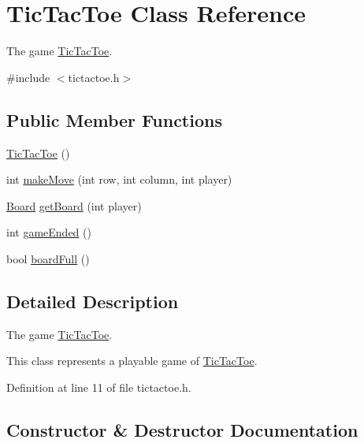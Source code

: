 \hypertarget{class_tic_tac_toe}{}\section{Tic\+Tac\+Toe Class Reference}
\label{class_tic_tac_toe}


The game \hyperlink{class_tic_tac_toe}{Tic\+Tac\+Toe}.  




{\ttfamily \#include $<$tictactoe.\+h$>$}

\subsection*{Public Member Functions}
\begin{DoxyCompactItemize}
\item 
\hyperlink{class_tic_tac_toe_a103fe9a5ae41b5ef756e20594a70cb7a}{Tic\+Tac\+Toe} ()
\item 
int \hyperlink{class_tic_tac_toe_a597a1911309c9350aa6ce48b817a0e9e}{make\+Move} (int row, int column, int player)
\item 
\hyperlink{constants_8h_af901d0acc1572fb0c779f84ddd2c6ce8}{Board} \hyperlink{class_tic_tac_toe_aeacd5865fa7f87f6fd9608b8ed1743a9}{get\+Board} (int player)
\item 
int \hyperlink{class_tic_tac_toe_a0ed1b3b4b699af8e7db79f502cbc9531}{game\+Ended} ()
\item 
bool \hyperlink{class_tic_tac_toe_a750e26d95ced2dca83c21279ef43def9}{board\+Full} ()
\end{DoxyCompactItemize}


\subsection{Detailed Description}
The game \hyperlink{class_tic_tac_toe}{Tic\+Tac\+Toe}. 

This class represents a playable game of \hyperlink{class_tic_tac_toe}{Tic\+Tac\+Toe}. 

Definition at line 11 of file tictactoe.\+h.



\subsection{Constructor \& Destructor Documentation}
\mbox{\label{class_tic_tac_toe_a103fe9a5ae41b5ef756e20594a70cb7a}} 
